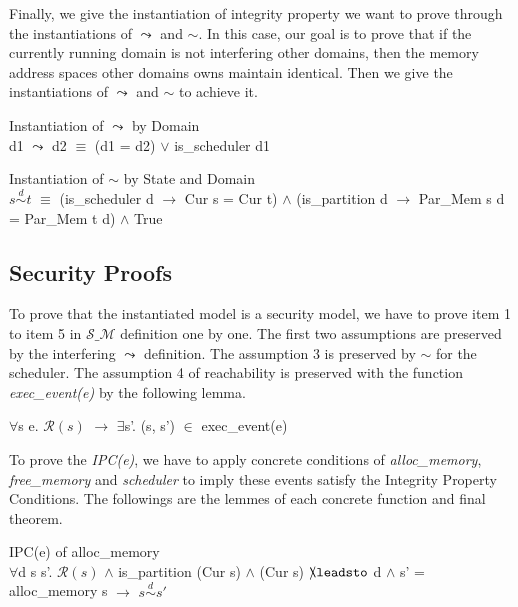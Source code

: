 \documentclass[runningheads]{llncs}
\makeatletter
\newcommand{\equidom}[3]{{#1}\stackrel{#2}{\sim}{#3}}
\newcommand{\superimpose}[2]
	{{\ooalign{$#1\@firstoftwo#2$\cr\hfil$#1\@secondoftwo#2$\hfil\cr}}}
\newcommand{\interf}{\leadsto}
\newcommand{\ninterf}{\mathrel{\mathpalette\superimpose{{\slash}{\leadsto}}}}
\makeatother
\begin{document}
Finally, we give the instantiation of integrity property we want to prove through the instantiations of $\interf$ and $\sim$. In this case, our goal is to prove that if the currently running domain is not interfering other domains, then the memory address spaces other domains owns maintain identical. Then we give the instantiations of $\interf$ and $\sim$ to achieve it.

\begin{definition} {Instantiation of $\interf$ by Domain} \\
d1 $\interf$ d2 $\equiv$ (d1 = d2) $\vee$ is\_scheduler d1
\end{definition}

\begin{definition} {Instantiation of $\sim$ by State and Domain} \\
$\equidom{s}{d}{t}$ $\equiv$ (is\_scheduler d $\longrightarrow$ Cur s = Cur t) $\wedge$ (is\_partition d $\longrightarrow$ Par\_Mem s d = Par\_Mem t d) $\wedge$ True
\end{definition}


\subsection{Security Proofs}

To prove that the instantiated model is a security model, we have to prove item 1 to item 5 in $\mathcal{S\_M}$ definition one by one. The first two assumptions are preserved by the interfering $\interf$ definition. The assumption 3 is preserved by $\sim$ for the scheduler. The assumption 4 of reachability is preserved with the function \emph{exec\_event(e)} by the following lemma.

\begin{lemma}
$\forall$s e. $\mathcal{R}(s)$ $\longrightarrow$ $\exists$s'. (s, s') $\in$ exec\_event(e)
\end{lemma}

To prove the \emph{IPC(e)}, we have to apply concrete conditions of \emph{alloc\_memory}, \emph{free\_memory} and \emph{scheduler} to imply these events satisfy the Integrity Property Conditions. The followings are the lemmes of each concrete function and final theorem.

\begin{lemma} {IPC(e) of alloc\_memory} \\
$\forall$d s s'. $\mathcal{R}(s)$ $\wedge$ is\_partition (Cur s) $\wedge$ (Cur s) $\ninterf$ d $\wedge$ s' = alloc\_memory s $\longrightarrow$ $\equidom{s}{d}{s'}$
\end{lemma}
\end{document}
